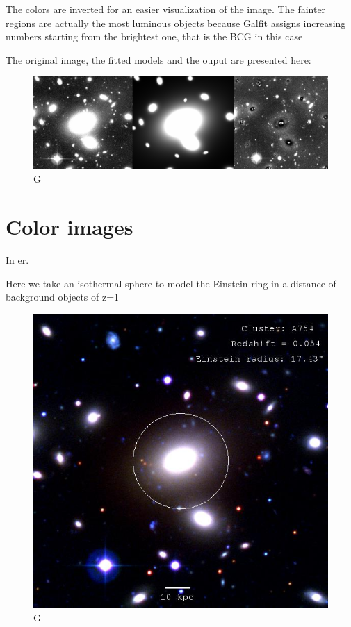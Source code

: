 The colors are inverted for an easier visualization of the image. The fainter regions are actually the most luminous objects because Galfit assigns increasing numbers starting from the brightest one, that is the BCG in this case

The original image, the fitted models and the ouput are presented here:

\begin{figure}[H]
\centering
\includegraphics[width=15cm]{images/galfit.png}
\caption[M]{G}
\end{figure}

\section{Color images}


In er.  

Here we take an isothermal sphere to model the Einstein ring in a distance of background objects of z=1

\begin{figure}[H]
\centering
\includegraphics[width=12cm]{images/cA754.jpg}
\caption[M]{G}
\end{figure}

